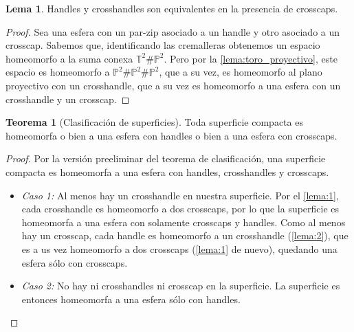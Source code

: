 \documentclass[10pt]{report}
\newcommand{\Toro}{\mathbb{T}^2}
\newcommand{\Proyectivo}{\mathbb{P}^2}
\newcommand{\enfatiza}[1]{\textbf{\textit{#1}}}
\theoremstyle{definition}
\newtheorem{tma}[defin]{Teorema}
\newtheorem{prop}[defin]{Proposición}
\newtheorem{lema}[defin]{Lema}
\begin{document}
\begin{lema}\label{lema:2}
Handles y crosshandles son equivalentes en la presencia de crosscaps.
\end{lema}
\begin{proof}
Sea una esfera con un par-zip asociado a un handle y otro asociado a un crosscap. Sabemos que, identificando las cremalleras obtenemos un espacio homeomorfo a la suma conexa $\Toro \# \Proyectivo$. Pero por la \autoref{lema:toro_proyectivo}, este espacio es homeomorfo a $\Proyectivo \# \Proyectivo \# \Proyectivo$, que a su vez, es homeomorfo al plano proyectivo con un crosshandle, que a su vez es homeomorfo a una esfera con un crosshandle y un crosscap.
\end{proof}
\begin{tma}[Clasificación de superficies]
Toda superficie compacta es homeomorfa o bien a una esfera con handles o bien a una esfera con crosscaps.
\end{tma}
\begin{proof}
Por la versión preeliminar del teorema de clasificación, una superficie compacta es homeomorfa a una esfera con handles, crosshandles y crosscaps.
\begin{itemize}
\item \textit{Caso 1:} Al menos hay un crosshandle en nuestra superficie. Por el \autoref{lema:1}, cada crosshandle es homeomorfo a dos crosscaps, por lo que la superficie es homeomorfa a una esfera con solamente crosscaps y handles. Como al menos hay un crosscap, cada handle es homeomorfo a un crosshandle (\autoref{lema:2}), que es a us vez homeomorfo a dos crosscaps (\autoref{lema:1} de nuevo), quedando una esfera sólo con crosscaps.
\item \textit{Caso 2:} No hay ni crosshandles ni crosscap en la superficie. La superficie es entonces homeomorfa a una esfera sólo con handles.
\end{itemize}
\end{proof}


\end{document}
